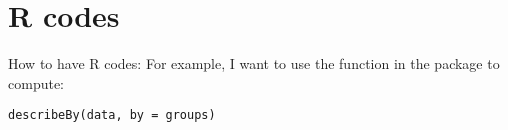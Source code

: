 \addappheadtotoc
\appendixtitleon
\appendixpage
\section{R codes}
\label{app:Rfleish}
How to have R codes: 
For example, I want to use the function  in the package  to compute: 
\begin{lstlisting}
describeBy(data, by = groups)
\end{lstlisting}